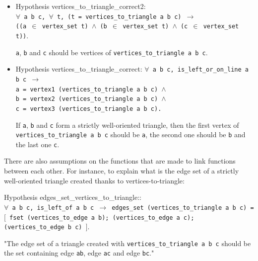 \documentclass[a4paper,10pt]{article}
\def\hypothesis#1#2{{\color{purple}Hypothesis} {\color{blue}#1}: {\tt #2}}
\begin{document}
\begin{itemize}
\item \hypothesis{vertices\_to\_triangle\_correct2}{\\$\forall$ a b c, $\forall$ t,
          (t = vertices\_to\_triangle a b c) $\rightarrow$\\
          ((a $\in$ vertex\_set t) $\wedge$ (b $\in$ vertex\_set t) $\wedge$ (c $\in$ vertex\_set t))}.
        
        {\tt a}, {\tt b} and {\tt c} should be vertices of {\tt vertices\_to\_triangle a b c}.


      \item \hypothesis{vertices\_to\_triangle\_correct}{$\forall$ a b c, 
    is\_left\_or\_on\_line a b c $\rightarrow$\\
    a = vertex1 (vertices\_to\_triangle a b c) $\wedge$\\
    b = vertex2 (vertices\_to\_triangle a b c) $\wedge$\\
    c = vertex3 (vertices\_to\_triangle a b c).}

  If {\tt a}, {\tt b} and {\tt c} form a strictly well-oriented triangle, then the first vertex of {\tt vertices\_to\_triangle a b c} should be {\tt a}, the second one should be {\tt b} and the last one {\tt c}.

        

\end{itemize}
There are also assumptions on the functions that are made to link functions between each other. For instance, to explain what is the edge set of a strictly well-oriented triangle created thanks to vertices-to-triangle:

\hypothesis{edges\_set\_vertices\_to\_triangle:}
  {\\$\forall$ a b c, is\_left\_of a b c $\rightarrow$
    edges\_set (vertices\_to\_triangle a b c) =\\ 
                       $[$ fset (vertices\_to\_edge a b);
                           (vertices\_to\_edge a c);
                           (vertices\_to\_edge b c) $]$}.

                         "The edge set of a triangle created with {\tt vertices\_to\_triangle a b c} should be the set containing edge {\tt ab}, edge {\tt ac} and edge {\tt bc}."
                         
\end{document}

